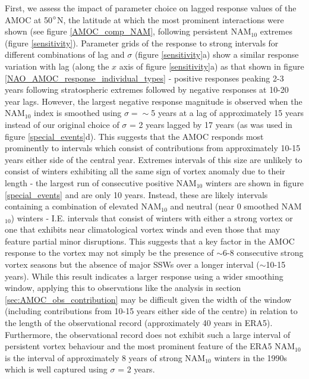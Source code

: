 First, we assess the impact of parameter choice on lagged response values of the AMOC at 50$\degree$N, the latitude at which the most prominent interactions were shown (see figure \ref{AMOC_comp_NAM}, following persistent NAM$_{10}$ extremes (figure \ref{sensitivity}). Parameter grids of the response to strong intervals for different combinations of lag and $\sigma$ (figure \ref{sensitivity}a) show a similar response variation with lag (along the $x$ axis of figure \ref{sensitivity}a) as that shown in figure \ref{NAO_AMOC_response_individual_types} - positive responses peaking 2-3 years following stratospheric extremes followed by negative responses at 10-20 year lags. However, the largest negative response magnitude is observed when the NAM$_{10}$ index is smoothed using $\sigma = \sim$5 years at a lag of approximately 15 years instead of our original choice of $\sigma$ = 2 years lagged by 17 years (as was used in figure \ref{special_events}d). This suggests that the AMOC responds most prominently to intervals which consist of contributions from approximately 10-15 years either side of the central year. Extremes intervals of this size are unlikely to consist of winters exhibiting all the same sign of vortex anomaly due to their length - the largest run of consecutive positive NAM$_{10}$ winters are shown in figure \ref{special_events} and are only 10 years. Instead, these are likely intervals containing a combination of elevated NAM$_{10}$ and neutral (near 0 smoothed NAM$_{10}$) winters - I.E. intervals that consist of winters with either a strong vortex or one that exhibits near climatological vortex winds and even those that may feature partial minor disruptions. This suggests that a key factor in the AMOC response to the vortex may not simply be the presence of $\sim$6-8 consecutive strong vortex seasons but the absence of major SSWs over a longer interval ($\sim$10-15 years). While this result indicates a larger response using a wider smoothing window, applying this to observations like the analysis in section \ref{sec:AMOC_obs_contribution} may be difficult given the width of the window (including contributions from 10-15 years either side of the centre) in relation to the length of the observational record (approximately 40 years in ERA5). Furthermore, the observational record does not exhibit such a large interval of persistent vortex behaviour and the most prominent feature of the ERA5 NAM$_{10}$ is the interval of approximately 8 years of strong NAM$_{10}$ winters in the 1990s which is well captured using $\sigma$ = 2 years. 

